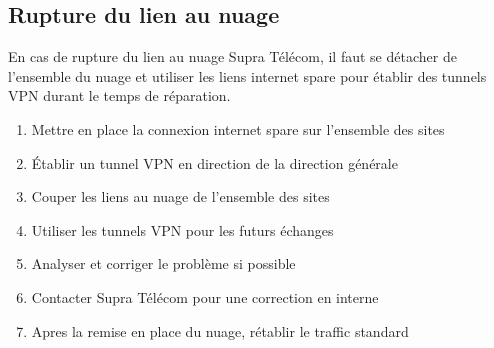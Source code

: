 \documentclass{article}
\newcommand{\spr}{Supra Télécom\xspace}
\begin{document}
\subsection{Rupture du lien au nuage}

En cas de rupture du lien au nuage \spr, il faut se détacher de l'ensemble du nuage et utiliser les liens internet spare pour établir des tunnels VPN durant le temps de réparation.

\bigskip

\begin{enumerate}
  \item Mettre en place la connexion internet spare sur l'ensemble des sites
  \item Établir un tunnel VPN en direction de la direction générale
  \item Couper les liens au nuage de l'ensemble des sites
  \item Utiliser les tunnels VPN pour les futurs échanges
  \item Analyser et corriger le problème si possible
  \item Contacter \spr pour une correction en interne
  \item Apres la remise en place du nuage, rétablir le traffic standard
\end{enumerate}
\end{document}
